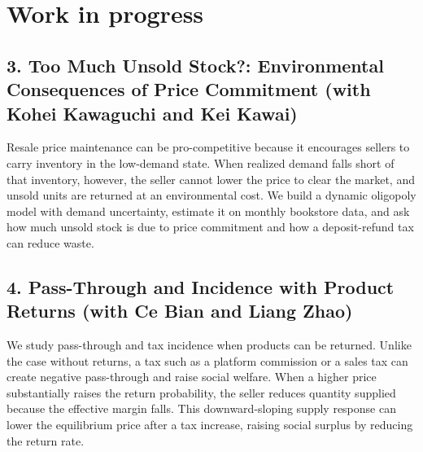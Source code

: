 \documentclass[11pt]{article}
\begin{document}
\section*{Work in progress}

\subsection*{3. Too Much Unsold Stock?: Environmental Consequences of Price Commitment (with Kohei Kawaguchi and Kei Kawai)}
Resale price maintenance can be pro-competitive because it encourages sellers to carry inventory in the low-demand state. When realized demand falls short of that inventory, however, the seller cannot lower the price to clear the market, and unsold units are returned at an environmental cost. We build a dynamic oligopoly model with demand uncertainty, estimate it on monthly bookstore data, and ask how much unsold stock is due to price commitment and how a deposit-refund tax can reduce waste.

\subsection*{4. Pass-Through and Incidence with Product Returns (with Ce Bian and Liang Zhao)}
We study pass-through and tax incidence when products can be returned. Unlike the case without returns, a tax such as a platform commission or a sales tax can create negative pass-through and raise social welfare. When a higher price substantially raises the return probability, the seller reduces quantity supplied because the effective margin falls. This downward-sloping supply response can lower the equilibrium price after a tax increase, raising social surplus by reducing the return rate.
\end{document}
